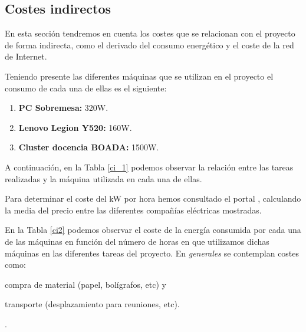 \documentclass[titlepage,12pt]{report}
\begin{document}
\subsection{Costes indirectos}

En esta sección tendremos en cuenta los costes que se relacionan con el proyecto de forma indirecta, como el derivado del consumo energético y el coste de la red de Internet.

Teniendo presente las diferentes máquinas que se utilizan en el proyecto el consumo de cada una de ellas es el siguiente:

\begin{enumerate}
	\item \textbf{PC Sobremesa:} 320W.
	\item \textbf{Lenovo Legion Y520:} 160W.
	\item \textbf{Cluster docencia BOADA:} 1500W.
\end{enumerate}

A continuación, en la Tabla \ref{ci_1} podemos observar la relación entre las tareas realizadas y la máquina utilizada en cada una de ellas.

\begin{table}[H]
	\centering
	\caption{Horas por tarea y recurso}
	\label{ci_1}
\end{table}

Para determinar el coste del kW por hora hemos consultado el portal \citep{tuLuz}, calculando la media del precio entre las diferentes compañías eléctricas mostradas. 

En la Tabla \ref{ci2} podemos observar el coste de la energía consumida por cada una de las máquinas en función del número de horas en que utilizamos dichas máquinas en las diferentes tareas del proyecto. En \textit{generales} se contemplan costes como: \begin{enumerate*}[label=\roman*)] \item compra de material (papel, bolígrafos, etc) y \item transporte (desplazamiento para reuniones, etc). \end{enumerate*}. 
\end{document}

